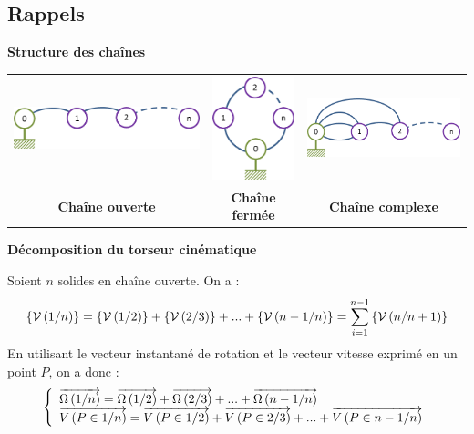 \documentclass[10pt]{article}
\begin{document}
\subsection{Rappels}
\begin{defi}

\textbf{Structure des chaînes}

\begin{center} 
\begin{tabular}{ccc}
\includegraphics[height=1.5cm]{images/def_co} &
\includegraphics[height=3cm]{images/def_cf} &
\includegraphics[height=2cm]{images/def_cc} \\
\textbf{Chaîne ouverte}&
\textbf{Chaîne fermée}&
\textbf{Chaîne complexe}
\end{tabular}
\end{center}
\end{defi}

\begin{defi}

\textbf{Décomposition du torseur cinématique}

Soient $n$ solides en chaîne ouverte. On a :
$$
\left\{\mathcal{V} \left(1/n \right) \right\} = \left\{\mathcal{V} \left(1/2 \right) \right\} + \left\{\mathcal{V} \left(2/3 \right) \right\} + ... + \left\{\mathcal{V} \left(n-1/n \right) \right\}
=\sum\limits_{i=1}^{n-1} \left\{\mathcal{V} \left(n/n+1 \right) \right\}
$$
En utilisant le vecteur instantané de rotation et le vecteur vitesse exprimé en un point $P$, on a donc : 
$$
\left\{
\begin{array}{l}
\overrightarrow{\Omega\left( {1}/{n}\right)} = \overrightarrow{\Omega\left( {1}/{2}\right)} + \overrightarrow{\Omega\left( {2}/{3}\right)} + ... +\overrightarrow{\Omega\left( {n-1}/{n}\right)} \\
\overrightarrow{V\left( {P} \in {1}/{n}\right)} = \overrightarrow{V\left( {P} \in {1}/{2}\right)} +\overrightarrow{V\left( {P} \in {2}/{3}\right)} + ... + \overrightarrow{V\left( {P} \in {n-1}/{n}\right)}
\end{array}
\right.
$$
\end{defi}
\end{document}
